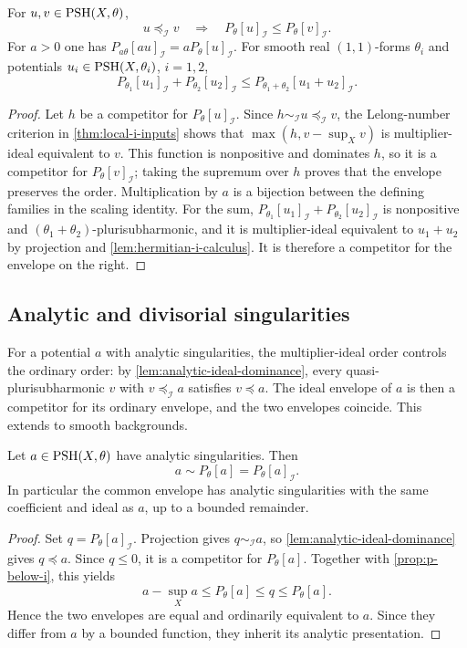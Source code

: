 \begin{proposition}\label{prop:i-envelope-operations}
For $u,v\in\mathrm{PSH}(X,\theta)$,
\[
 u\preceq_{\mathcal I}v\quad\Longrightarrow\quad
 P_\theta[u]_{\mathcal I}\leq P_\theta[v]_{\mathcal I}.
\]
For $a>0$ one has $P_{a\theta}[a u]_{\mathcal I}=aP_\theta[u]_{\mathcal I}$. For smooth real $(1,1)$-forms $\theta_i$ and potentials $u_i\in\mathrm{PSH}(X,\theta_i)$, $i=1,2$,
\[
 P_{\theta_1}[u_1]_{\mathcal I}+P_{\theta_2}[u_2]_{\mathcal I}
 \leq P_{\theta_1+\theta_2}[u_1+u_2]_{\mathcal I}.
\]
\end{proposition}
\begin{proof}
Let $h$ be a competitor for $P_\theta[u]_{\mathcal I}$. Since $h\sim_{\mathcal I}u\preceq_{\mathcal I}v$, the Lelong-number criterion in \cref{thm:local-i-inputs} shows that $\max(h,v-\sup_Xv)$ is multiplier-ideal equivalent to $v$. This function is nonpositive and dominates $h$, so it is a competitor for $P_\theta[v]_{\mathcal I}$; taking the supremum over $h$ proves that the envelope preserves the order. Multiplication by $a$ is a bijection between the defining families in the scaling identity. For the sum, $P_{\theta_1}[u_1]_{\mathcal I}+P_{\theta_2}[u_2]_{\mathcal I}$ is nonpositive and $(\theta_1+\theta_2)$-plurisubharmonic, and it is multiplier-ideal equivalent to $u_1+u_2$ by projection and \cref{lem:hermitian-i-calculus}. It is therefore a competitor for the envelope on the right.
\end{proof}

\subsection{Analytic and divisorial singularities}

For a potential $a$ with analytic singularities, the multiplier-ideal order controls the ordinary order: by \cref{lem:analytic-ideal-dominance}, every quasi-plurisubharmonic $v$ with $v\preceq_{\mathcal I}a$ satisfies $v\preceq a$. The ideal envelope of $a$ is then a competitor for its ordinary envelope, and the two envelopes coincide. This extends \cite[Proposition~3.2.10]{SGPT} to smooth backgrounds.

\begin{proposition}\label{prop:analytic-envelope-type}
Let $a\in\mathrm{PSH}(X,\theta)$ have analytic singularities. Then
\[
 a\sim P_\theta[a]=P_\theta[a]_{\mathcal I}.
\]
In particular the common envelope has analytic singularities with the same coefficient and ideal as $a$, up to a bounded remainder.
\end{proposition}
\begin{proof}
Set $q=P_\theta[a]_{\mathcal I}$. Projection gives $q\sim_{\mathcal I}a$, so \cref{lem:analytic-ideal-dominance} gives $q\preceq a$. Since $q\leq0$, it is a competitor for $P_\theta[a]$. Together with \cref{prop:p-below-i}, this yields
\[
 a-\sup_Xa\leq P_\theta[a]\leq q\leq P_\theta[a].
\]
Hence the two envelopes are equal and ordinarily equivalent to $a$. Since they differ from $a$ by a bounded function, they inherit its analytic presentation.
\end{proof}


